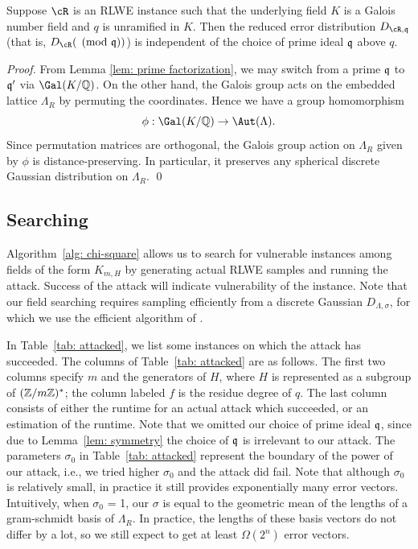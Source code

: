 \documentclass[envcountsame]{llncs}
\begin{document}
\begin{lemma} \label{lem: symmetry}
Suppose $\cR$ is an RLWE instance such that the underlying field $K$ is a Galois number field and $q$ is unramified in $K$. Then the reduced error distribution $D_{\cR,\fq}$ (that is, $D_{\cR} (\pmod{\fq})$) is independent of the choice of prime ideal $\mathfrak{q}$ above $q$.
\end{lemma}

\begin{proof}
        From Lemma \ref{lem: prime factorization}, we may switch from a prime $\mathfrak{q}$ to $\mathfrak{q}'$ via $\Gal(K/\bQ)$. On the other hand, the Galois group acts on the embedded lattice $\Lambda_R$ by permuting the coordinates. Hence we have a group homomorphism $$\phi: \Gal(K/\bQ) \to \Aut(\Lambda).$$ Since permutation matrices are orthogonal, the Galois group action on $\Lambda_R$ given by $\phi$ is distance-preserving. In particular, it preserves any spherical discrete Gaussian distribution on $\Lambda_R$.
\qed \end{proof}

\subsection{Searching}

Algorithm~\ref{alg: chi-square} allows us to search for vulnerable instances among fields of the form $K_{m,H}$ by generating actual RLWE samples and running the attack. Success of the attack will indicate vulnerability of the instance. Note that our field searching requires sampling efficiently from a discrete Gaussian $D_{\Lambda, \sigma}$, for which we use the efficient algorithm of \cite{gentry2008trapdoors}.


In Table~\ref{tab: attacked}, we list some instances on which the attack has succeeded. The columns of Table~\ref{tab: attacked} are as follows. The first two columns specify $m$ and the generators of $H$, where $H$ is represented as
a subgroup of $(\mathbb{Z}/m\mathbb{Z})^*$; the column labeled $f$ is the residue degree of $q$. The last column consists of either the runtime for an actual attack which succeeded, or an estimation of the runtime. Note that we omitted our choice of prime ideal $\mathfrak{q}$, since due to Lemma~\ref{lem: symmetry} the choice of $\mathfrak{q}$ is irrelevant to our attack. The parameters $\sigma_0$ in Table~\ref{tab: attacked} represent the boundary of the power of our attack, i.e., we tried higher $\sigma_0$ and the attack did fail. Note that although $\sigma_0$ is relatively small, in practice it still provides exponentially many error vectors. Intuitively, when $\sigma_0$ = 1, our $\sigma$ is equal to the geometric mean of the lengths of a gram-schmidt basis of $\Lambda_R$. In practice, the lengths of these basis vectors do not differ by a lot, so we still expect to get at least $\Omega(2^n)$ error vectors.
\end{document}
